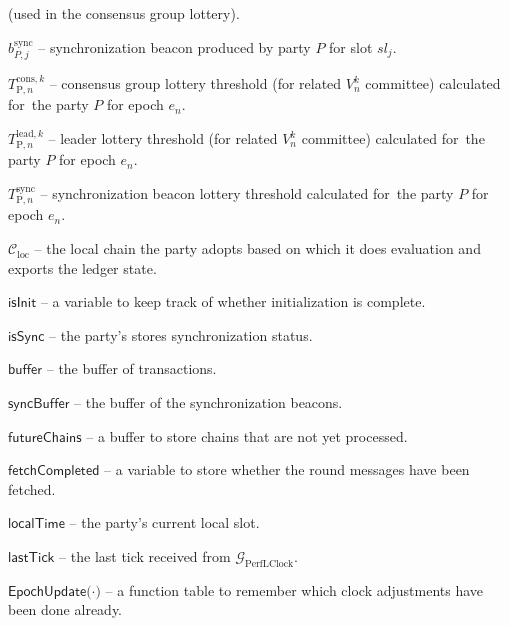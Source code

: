 \begin{legal}
    (used in the consensus group lottery).
    \item[\ding{113}] $b^{\text{sync}}_{P, j}$ -- synchronization beacon produced by party $P$ for slot $sl_j$.
    \item[\ding{113}] $T^{\text{cons}, k}_{\text{P}, n}$ -- consensus group lottery threshold (for related  $V^k_n$ committee) calculated for\
    the party $P$ for epoch $e_n$.
    \item[\ding{113}] $T^{\text{lead}, k}_{\text{P}, n}$ -- leader lottery threshold (for related $V^k_n$ committee) calculated for\
    the party $P$ for epoch $e_n$.
    \item[\ding{113}] $T^{\text{sync}}_{\text{P}, n}$ -- synchronization beacon lottery threshold calculated for\
    the party $P$ for epoch $e_n$.
    \item[\ding{113}] $\mathcal{C}_{\text{loc}}$ -- the local chain the party adopts based on which it does evaluation and
    exports the ledger state.
    \item[\ding{113}] $\textsf{isInit}$ -- a variable to keep track of whether initialization is complete.
    \item[\ding{113}] $\textsf{isSync}$ -- the party's stores synchronization status.
    \item[\ding{113}] $\textsf{buffer}$ -- the buffer of transactions.
    \item[\ding{113}] $\textsf{syncBuffer}$ -- the buffer of the synchronization beacons.
    \item[\ding{113}] $\textsf{futureChains}$ -- a buﬀer to store chains that are not yet processed.
    \item[\ding{113}] $\textsf{fetchCompleted}$ -- a variable to store whether the round messages have been fetched.
    \item[\ding{113}] $\textsf{localTime}$ -- the party's current local slot.
    \item[\ding{113}] $\textsf{lastTick}$ -- the last tick received from $\mathcal{G}_{\text{PerfLClock}}$.
    \item[\ding{113}] $\textsf{EpochUpdate(·)}$ -- a function table to remember which clock adjustments have been done already.

\end{legal}
